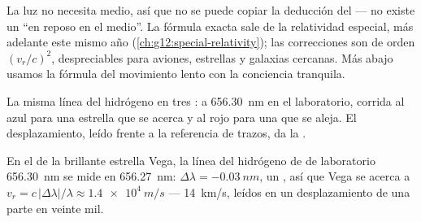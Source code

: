 \begin{remark}\label{rem:g12:doppler-effect:honest}
La luz no necesita medio, así que no se puede copiar la deducción del
 --- no existe un ``en reposo en el medio''. La fórmula exacta sale
de la relatividad especial, más adelante este mismo año
(\cref{ch:g12:special-relativity}); las correcciones son de orden
$(v_r/c)^2$, despreciables para aviones, estrellas y galaxias cercanas.
Más abajo usamos la fórmula del movimiento lento con la conciencia
tranquila.
\end{remark}

\begin{omfigure}

{\small La misma línea del hidrógeno en tres : a
\qty{656.30}{nm} en el laboratorio, corrida al azul para una estrella
que se acerca y al rojo para una que se aleja. El desplazamiento, leído
frente a la referencia de trazos, da la .}
\end{omfigure}

\begin{example}\label{ex:g12:doppler-effect:vega}
En el  de la brillante estrella Vega, la línea del hidrógeno de
 de laboratorio \qty{656.30}{nm} se mide en
\qty{656.27}{nm}: $\Delta\lambda = \qty{-0.03}{nm}$, un , así que Vega se acerca a
$v_r = c\,|\Delta\lambda|/\lambda \approx \qty{1.4e4}{m/s}$ ---
\qty{14}{km/s}, leídos en un desplazamiento de una parte en veinte mil.
\end{example}

